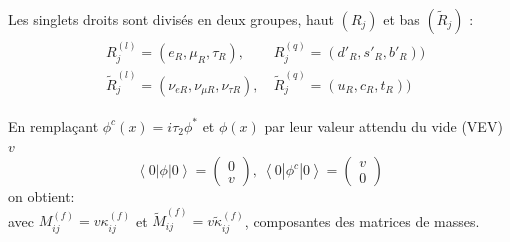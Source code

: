 Les singlets droits sont divisés en deux groupes, haut $\left(R_{j}\right)$ et bas $\left(\tilde{R}_{j}\right)$ :
\begin{multline}
\begin{split}
&R_j^{(l)}=\left(e_{R},\mu_{R},\tau_{R}\right),\ &R_j^{(q)}=\left(d'_{R},s'_{R},b'_{R}\right))\\
&\tilde{R}_j^{(l)}=\left(\nu_{eR},\nu_{\mu R},\nu_{\tau R}\right),\ &\tilde{R}_j^{(q)}=\left(u_{R},c_{R},t_{R}\right))
\end{split}
\end{multline} 

En remplaçant $\phi^{c}(x)=i\tau_{2}\phi^{*}$ et $\phi(x)$ par leur valeur attendu du vide (VEV) $v$
\begin{equation}
\left<0\left|\phi \right|0\right>=\begin{pmatrix} 0\\v\end{pmatrix},\ \left<0\left|\phi^{c} \right|0\right>=\begin{pmatrix} v\\ 0\end{pmatrix}
\end{equation} on obtient:
\begin{equation}
\end{equation} 
avec $M^{(f)}_{ij}=v\kappa_{ij}^{(f)}$ et $\tilde{M}^{(f)}_{ij}=v\tilde{\kappa}_{ij}^{(f)}$, composantes des matrices de masses.

